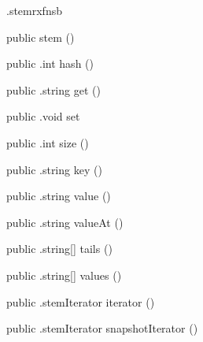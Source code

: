 \begin{CrexxClass}{.stem}{rxfnsb}

  \begin{Hierarchy}
  \end{Hierarchy}

  \begin{Members}

    \Factory
      {public}
      {stem}
      {()}

    \Method
      {public}
      {.int}
      {hash}
      {()}

    \Method
      {public}
      {.string}
      {get}
      {()}

    \Method
      {public}
      {.void}
      {set}
      {}

    \Method
      {public}
      {.int}
      {size}
      {()}

    \Method
      {public}
      {.string}
      {key}
      {()}

    \Method
      {public}
      {.string}
      {value}
      {()}

    \Method
      {public}
      {.string}
      {valueAt}
      {()}

    \Method
      {public}
      {.string[]}
      {tails}
      {()}

    \Method
      {public}
      {.string[]}
      {values}
      {()}

    \Method
      {public}
      {.stemIterator}
      {iterator}
      {()}

    \Method
      {public}
      {.stemIterator}
      {snapshotIterator}
      {()}

  \end{Members}
\end{CrexxClass}

